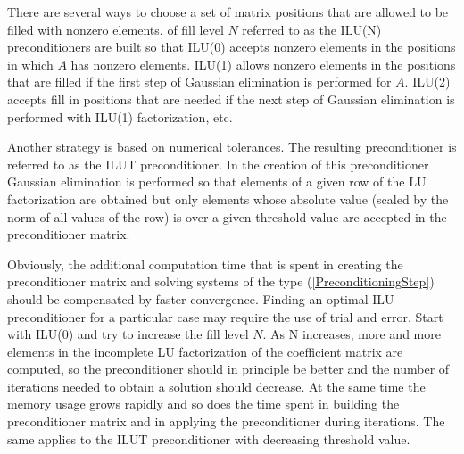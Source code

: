 \begin{versiona}
There are several ways to choose a set of matrix positions that are allowed to be filled 
with nonzero elements.  of fill level $N$ referred to 
as the ILU(N) preconditioners are built so that ILU(0) accepts nonzero elements in the positions 
in which $A$ has nonzero elements. ILU(1) allows nonzero elements in the positions that are 
filled if the first step of Gaussian elimination is performed for $A$. 
ILU(2) accepts fill in positions that are needed if the next step of Gaussian 
elimination is performed with ILU(1) factorization, etc.    

Another strategy is based on numerical tolerances. The resulting preconditioner is 
referred to as the ILUT preconditioner. In the creation of this preconditioner   
Gaussian elimination is performed so that elements of a given
row of the LU factorization are obtained but only elements whose absolute
value (scaled by the norm of all values of the row) is over a given threshold value 
are accepted in the preconditioner matrix.

Obviously, the additional computation time that is spent in creating the preconditioner
matrix and solving systems of the type (\ref{PreconditioningStep}) 
should be compensated by faster convergence. Finding an optimal ILU preconditioner for
a particular case may require the use of trial and error. Start with ILU(0) and 
try to increase the fill level $N$. 
As N increases, more and more elements in the incomplete LU factorization of the coefficient 
matrix are computed, so the preconditioner should in principle be better and the number of iterations 
needed to obtain a solution should decrease. At the same time the memory usage grows rapidly and 
so does the time spent 
in building the preconditioner matrix and in applying the preconditioner during iterations. 
The same applies to the ILUT preconditioner with decreasing threshold value.  
      


\end{versiona}
